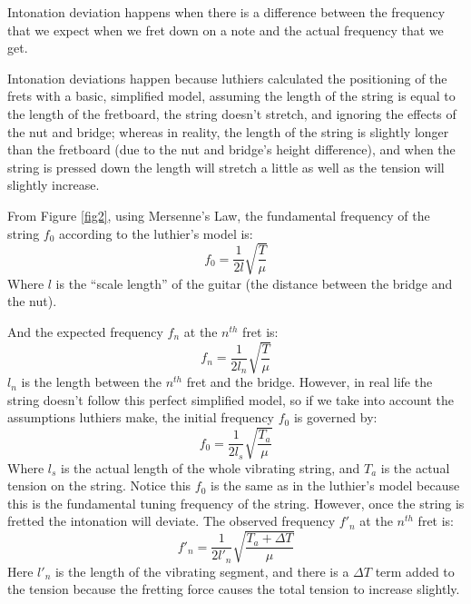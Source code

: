 Intonation deviation happens when there is a difference between the frequency that we expect when we fret down on a note and the actual frequency that we get.

Intonation deviations happen because luthiers calculated the positioning of the frets with a basic, simplified model, assuming the length of the string is equal to the length of the fretboard, the string doesn't stretch, and ignoring the effects of the nut and bridge; whereas in reality, the length of the string is slightly longer than the fretboard (due to the nut and bridge's height difference), and when the string is pressed down the length will stretch a little as well as the tension will slightly increase. 

From Figure \ref{fig2}, using Mersenne's Law, the fundamental frequency of the string $f_0$ according to the luthier's model is:
\begin{equation} \label{eqn3}
    f_0 = \frac{1}{2l}\sqrt{\frac{T}{\mu}}
\end{equation} 
Where $l$ is the “scale length” of the guitar (the distance between the bridge and the nut). \cite{mersenne} 

And the expected frequency $f_n$ at the $n^{th}$ fret is: 
\begin{equation} \label{eqn4}
    f_n = \frac{1}{2l_n}\sqrt{\frac{T}{\mu}}
\end{equation}
$l_n$ is the length between the $n^{th}$ fret and the bridge. However, in real life the string doesn't follow this perfect simplified model, so if we take into account the assumptions luthiers make, the initial frequency $f_0$ is governed by:
\begin{equation} \label{eqn5}
    f_0 = \frac{1}{2l_s}\sqrt{\frac{T_a}{\mu}}
\end{equation}
Where $l_s$ is the actual length of the whole vibrating string, and $T_a$ is the actual tension on the string. Notice this $f_0$ is the same as in the luthier's model because this is the fundamental tuning frequency of the string. However, once the string is fretted the intonation will deviate. The observed frequency $f'_n$ at the $n^{th}$ fret is: 
\begin{equation} \label{eqn6}
    f'_n = \frac{1}{2l'_n}\sqrt{\frac{T_a + \Delta T}{\mu}}
\end{equation}
Here $l'_n$ is the length of the vibrating segment, and there is a $\Delta T$ term added to the tension because the fretting force causes the total tension to increase slightly. 

